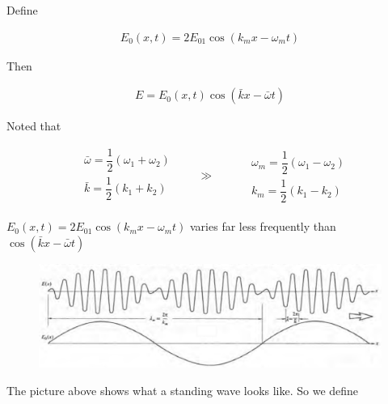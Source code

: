 Define

\begin{equation*}
  \begin{aligned}
    E_0 \left( x,t \right) = 2 E_{01} \cos \left( k_m x - \omega_m t \right)
  \end{aligned}
\end{equation*}

Then

\begin{equation*}
  \begin{aligned}
    E = E_0 \left( x , t \right) \cos \left( \bar{k} x - \bar{\omega} t \right)
  \end{aligned}
\end{equation*}

Noted that

\begin{equation*}
  \begin{aligned}
    & \bar{\omega} = \dfrac{1}{2} \left( \omega_1 + \omega_2 \right) \\ 
    & \bar{k} = \dfrac{1}{2} \left( k_1 + k_2 \right) \\
  \end{aligned}
  \quad\quad \gg \quad\quad
  \begin{aligned}
      & \omega_m = \dfrac{1}{2} \left( \omega_1 - \omega_2 \right) \\ 
      & k_m = \dfrac{1}{2} \left( k_1 - k_2 \right) 
  \end{aligned}
\end{equation*}

$E_0 \left( x,t \right) = 2 E_{01} \cos \left( k_m x - \omega_m t \right)$ varies far less frequently than $\cos \left( \bar{k} x - \bar{\omega} t \right)$

\begin{figure}[H]
  \centering
  \includegraphics[width=\linewidth]{figures/Standing-Wave}
\end{figure}

The picture above shows what a standing wave looks like. So we define

